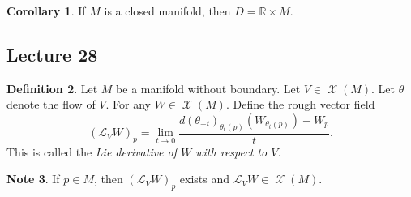 \documentclass[10pt,letterpaper,cm]{nupset}
\theoremstyle{definition}
\newtheorem{definition}{Definition}[subsection]
\newtheorem{note}[definition]{Note}
\theoremstyle{theorem}
\newtheorem{corollary}[definition]{Corollary}
\theoremstyle{remark}
\newcommand{\R}{\mathbb R}
\newcommand{\1}{\mathbf{1}}
\newcommand{\0}{\vec 0}
\DeclareMathOperator{\vf}{\mathscr{X}}
\begin{document}
\begin{corollary}
If $M$ is a closed manifold, then $D = \R \times M$.
\end{corollary}

\subsection{Lecture 28}

\begin{definition}
Let $M$ be a manifold without boundary. Let $V\in \vf(M)$. Let $\theta$ denote the flow of $V$. For any $W\in \vf(M)$. Define the rough vector field $$ (\mathcal{L}_VW)_p  = \lim_{t\to 0}\frac{d(\theta_{-t})_{\theta_t(p)}(W_{\theta_{t}(p)})-W_p }{t}.$$ This is called the \textit{Lie derivative of $W$ with respect to $V$.}
\end{definition}

\begin{note}
If $p\in M$, then $(\mathcal{L}_VW)_p$ exists and $\mathcal{L}_VW \in \vf(M)$. 
\end{note}
\end{document}
